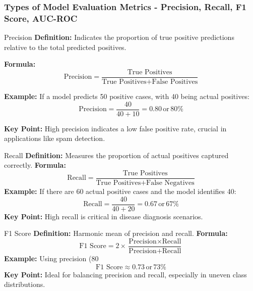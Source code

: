 \documentclass[aspectratio=169]{beamer}
\begin{document}
\begin{frame}[fragile]
    \frametitle{Types of Model Evaluation Metrics - Precision, Recall, F1 Score, AUC-ROC}
    \begin{block}{Precision}
        \textbf{Definition:} Indicates the proportion of true positive predictions relative to the total predicted positives.
        
        \textbf{Formula:}
        \begin{equation}
            \text{Precision} = \frac{\text{True Positives}}{\text{True Positives} + \text{False Positives}}
        \end{equation}
        
        \textbf{Example:} If a model predicts 50 positive cases, with 40 being actual positives:
        \begin{equation}
            \text{Precision} = \frac{40}{40 + 10} = 0.80 \, \text{or} \, 80\%
        \end{equation}
        
        \textbf{Key Point:} High precision indicates a low false positive rate, crucial in applications like spam detection.
    \end{block}

    \begin{block}{Recall}
        \textbf{Definition:} Measures the proportion of actual positives captured correctly. 
        \textbf{Formula:}
        \begin{equation}
            \text{Recall} = \frac{\text{True Positives}}{\text{True Positives} + \text{False Negatives}}
        \end{equation}
        \textbf{Example:} If there are 60 actual positive cases and the model identifies 40:
        \begin{equation}
            \text{Recall} = \frac{40}{40 + 20} = 0.67 \, \text{or} \, 67\%
        \end{equation}
        \textbf{Key Point:} High recall is critical in disease diagnosis scenarios.
    \end{block}
    
    \begin{block}{F1 Score}
        \textbf{Definition:} Harmonic mean of precision and recall.
        \textbf{Formula:}
        \begin{equation}
            \text{F1 Score} = 2 \times \frac{\text{Precision} \times \text{Recall}}{\text{Precision} + \text{Recall}}
        \end{equation}
        \textbf{Example:} 
        Using precision (80%
        \begin{equation}
            \text{F1 Score} \approx 0.73 \, \text{or} \, 73\%
        \end{equation}
        \textbf{Key Point:} Ideal for balancing precision and recall, especially in uneven class distributions.
    \end{block}


\end{frame}
\end{document}
